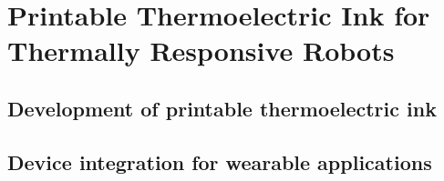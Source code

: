 \chapter{Printable Thermoelectric Ink for Thermally Responsive Robots} \label{chapTEGs}
\section{Development of printable thermoelectric ink}

\section{Device integration for wearable applications}